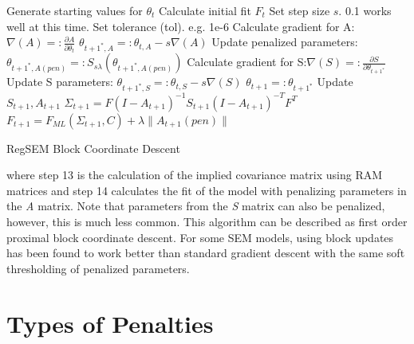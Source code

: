 \begin{minipage}{\textwidth}
    \begin{algorithm}[H]
        \begin{algorithmic}[1]
            \State Generate starting values for $\theta_{t}$
            \State Calculate initial fit $F_{t}$
            \State Set step size $s$. 0.1 works well at this time.
            \State Set tolerance (tol). e.g. 1e-6
            \State Calculate gradient for A:$ \nabla (A) =:  \frac{\partial A}{\partial \theta_{t}}$
            \State $ \theta_{t+1^{*},A} =: \theta_{t,A} - s \nabla(A)$
            \State  Update penalized parameters: $\theta_{t+1^{*},A(pen)} =: S_{s \lambda}(\theta_{t+1^{*},A(pen)})$
            \State Calculate gradient for S:$ \nabla (S) =:  \frac{\partial S}{\partial \theta_{t+1^{*}}}$ 
            \State Update S parameters: $ \theta_{t+1^{*},S} =: \theta_{t,S} - s \nabla(S)$
            \State $\theta_{t+1} =: \theta_{t+1^{*}}$ %
            \State Update $S_{t+1}, A_{t+1}$
            \State $ \Sigma_{t+1} = F(I-A_{t+1})^{-1}S_{t+1}(I-A_{t+1})^{-T}F^{T}$
            \State $ F_{t+1} = F_{ML}(\Sigma_{t+1},C) + \lambda \| A_{t+1}(pen) \|$
            \EndWhile
        \end{algorithmic}
        \caption{RegSEM Block Coordinate Descent}
        \label{alg:seq}
    \end{algorithm}
\end{minipage}

where step 13 is the calculation of the implied covariance matrix using
RAM matrices and step 14 calculates the fit of the model with penalizing
parameters in the \textit{A} matrix. Note that parameters from the
\textit{S} matrix can also be penalized, however, this is much less
common. This algorithm can be described as first order proximal block
coordinate descent. For some SEM models, using block updates has been
found to work better than standard gradient descent with the same soft
thresholding of penalized parameters.

\section{Types of Penalties}\label{types-of-penalties}

